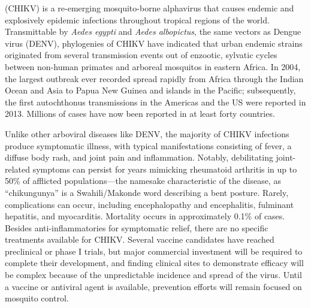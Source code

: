  (CHIKV) is a re-emerging mosquito-borne alphavirus that causes endemic and explosively epidemic infections throughout tropical regions of the world.\autocite{Weaver2015} Transmittable by \emph{Aedes egypti} and \emph{Aedes albopictus}, the same vectors as Dengue virus (DENV), phylogenies of CHIKV have indicated that urban endemic strains originated from several transmission events out of enzootic, sylvatic cycles between non-human primates and arboreal mosquitos in eastern Africa.\autocite{Volk2010} In 2004, the largest outbreak ever recorded spread rapidly from Africa through the Indian Ocean and Asia to Papua New Guinea and islands in the Pacific; subsequently, the first autochthonus transmissions in the Americas and the US were reported in 2013.\autocite{Nasci2014} Millions of cases have now been reported in at least forty countries.\autocite{Suhrbier2012}

Unlike other arboviral diseases like DENV, the majority of CHIKV infections produce symptomatic illness, with typical manifestations consisting of fever, a diffuse body rash, and joint pain and inflammation.\autocite{Couderc2015,Weaver2015} Notably, debilitating joint-related symptoms can persist for years mimicking rheumatoid arthritis in up to 50\% of afflicted populations—the namesake characteristic of the disease, as “chikungunya” is a Swahili/Makonde word describing a bent posture.\autocite{Miner2015,Weaver2015} Rarely, complications can occur, including encephalopathy and encephalitis, fulminant hepatitis, and myocarditis.\autocite{Rolph2015} Mortality occurs in approximately 0.1\% of cases.\autocite{Rolph2015} Besides anti-inflammatories for symptomatic relief, there are no specific treatments available for CHIKV.\autocite{Suhrbier2012,Weaver2015} Several vaccine candidates have reached preclinical or phase I trials,\autocite{Plante2015,Weger-Lucarelli2014} but major commercial investment will be required to complete their development, and finding clinical sites to demonstrate efficacy will be complex because of the unpredictable incidence and spread of the virus.\autocite{Weaver2015} Until a vaccine or antiviral agent is available, prevention efforts will remain focused on mosquito control.\autocite{Weaver2015}  

